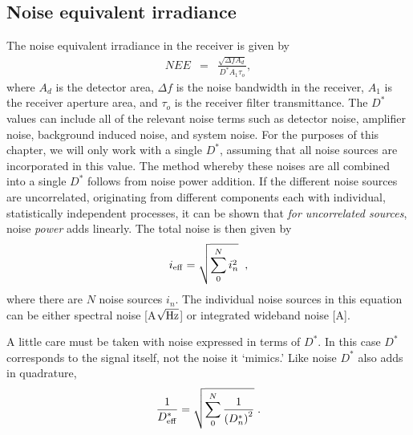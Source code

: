 \subsection{Noise equivalent irradiance}
\noindent
The noise equivalent irradiance in the receiver is given by \cite{Willers2013}
\begin{eqnarray}
NEE&=& \frac{
\sqrt{\Delta f A_d}
}{
D^\ast A_1 \tau_o
},
\label{lrfnoise}\label{laserrxn}
\end{eqnarray}
where 
$A_d$ is the detector area, 
$\Delta f$ is the noise bandwidth in the receiver, 
$A_1$ is the receiver aperture area, and 
$\tau_o$ is the receiver filter transmittance. The
$D^\ast$ values can include all of the relevant noise terms such as detector noise, amplifier noise, background induced noise, and system noise. 
For the purposes of this chapter, we will only work with a single $D^\ast$, assuming that all noise sources are incorporated in this value.
The method whereby these noises are all combined into a single $D^\ast$ follows from noise power addition. If the different noise sources are uncorrelated, originating from different components each with individual, statistically independent processes, it can be shown that \textit{for uncorrelated sources},  noise \textit{power} adds linearly. The total noise is then given by
\begin{equation}
i_{\rm eff}=\sqrt{\sum_0^N i_n^2}\;\;,\label{eq:combinenoisesources}
\end{equation}
where there are $N$ noise sources $i_n$. The individual noise sources in this equation can be either spectral noise [A$\sqrt{\rm Hz}$] or integrated wideband noise [A].

A little care must be taken with noise expressed in terms of $D^\ast$. In this case $D^\ast$ corresponds to the signal itself, not the noise it `mimics.' 
Like noise $D^\ast$ also adds in quadrature,
\begin{equation}
\frac{1}{D^\ast_{\rm eff}}=\sqrt{\sum_0^N 
\frac{1}{\left(D^\ast_n\right)^2}
}\;.\label{eq:combinenoiseDeeStar}
\end{equation}


